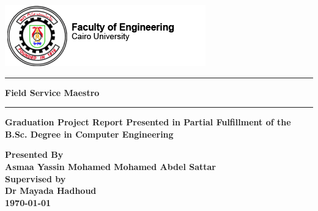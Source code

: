 \documentclass[12pt,a4paper]{report}
\begin{document}
\newcommand{\HRule}{\rule{\linewidth}{0.5mm}}
\begin{titlepage}
	\begin{center}
			\centering
			\includegraphics[width=\textwidth]{cairoLogo.png}

		\Huge
		\HRule
		
		\textbf{Field Service Maestro}
		\HRule
		
		\vspace*{0.5cm}
		
		\Large
		\textbf{ Graduation Project Report Presented in
Partial Fulfillment of the B.Sc. Degree in Computer Engineering}

		\large
		\vspace*{1.5cm}
		{\textbf{Presented By}}\\
		\Large \textbf{
		{Asmaa Yassin Mohamed}
		\hfill
		{Mohamed Abdel Sattar}\\
		}
		\vspace*{1.5cm}
		{\textbf {\large Supervised by}}\\
		\textbf{\LARGE Dr Mayada Hadhoud}\\
		\vfill
		{\textbf{\today}}
	\end{center}
\end{titlepage}
\end{document}
